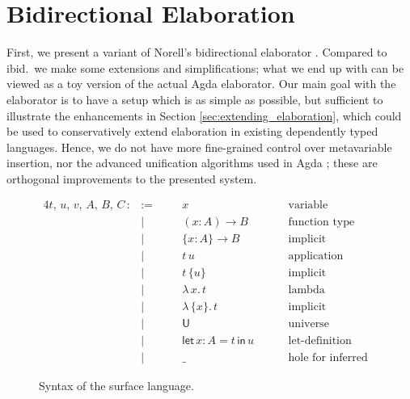 \documentclass[acmsmall,screen,dvipsnames]{acmart}\settopmatter{}
\newcommand{\slet}{\boldsymbol{\mathsf{let}}}
\renewcommand{\sin}{\boldsymbol{\mathsf{in}}}
\renewcommand{\U}{\mathsf{U}}
\theoremstyle{remark}
\begin{document}
\section{Bidirectional Elaboration}
\label{sec:bidirectional_elaboration}

First, we present a variant of Norell's bidirectional elaborator
\cite[Chapter~3]{norell07thesis}. Compared to ibid.\ we make some extensions and
simplifications; what we end up with can be viewed as a toy version of the
actual Agda elaborator. Our main goal with the elaborator is to have a setup
which is as simple as possible, but sufficient to illustrate the enhancements in
Section \ref{sec:extending_elaboration}, which could be used to conservatively
extend elaboration in existing dependently typed languages. Hence, we do not
have more fine-grained control over metavariable insertion, nor the advanced
unification algorithms used in Agda \cite{abel2011higher}; these are orthogonal
improvements to the presented system.

\begin{figure}[h]
\begin{alignat*}{4}
  t,\,u,\,v,\,A,\,B,\,C\, :&:=\quad  && x\hspace{8em}              & \text{variable}                 &  \\
                           & |       && (x : A)\to B               & \text{function type}            &  \\
                           & |       && \{x : A\}\to B             & \text{implicit function type}   &  \\
                           & |       && t\,u                       & \text{application}              &  \\
                           & |       && t\,\{u\}                   & \text{implicit application}     &  \\
                           & |       && \lambda\,x.\, t            & \text{lambda abstraction}       &  \\
                           & |       && \lambda\,\{x\}.\,t         & \text{implicit abstraction}     &  \\
                           & |       && \U                         & \text{universe}                 &  \\
                           & |       && \slet\,x : A = t\,\sin\, u & \text{let-definition}           &  \\
                           & |       && \_                         & \text{hole for inferred term}   &
\end{alignat*}
\caption{Syntax of the surface language.}
\label{fig:surface}
\end{figure}
\end{document}
